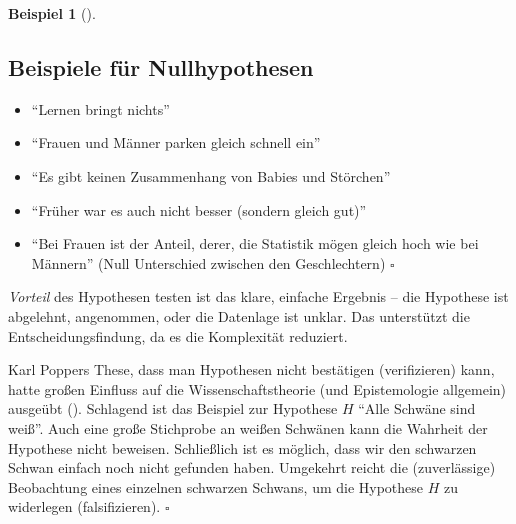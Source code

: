 \documentclass[
  ngerman,
  letterpaper,
  twoside,
  open=any]{scrbook}
\providecommand{\tightlist}{%
  \setlength{\itemsep}{0pt}\setlength{\parskip}{0pt}}\usepackage{longtable,booktabs,array}
\theoremstyle{definition}
\newtheorem{example}{Beispiel}[chapter]
\theoremstyle{plain}
\theoremstyle{definition}
\theoremstyle{definition}
\theoremstyle{remark}
\begin{document}
\begin{example}[]
\begin{tcolorbox}
\end{tcolorbox}


\subsection{Beispiele für
Nullhypothesen}\label{beispiele-fuxfcr-nullhypothesen-1}

\begin{itemize}
\tightlist
\item
  \enquote{Lernen bringt nichts}
\item
  \enquote{Frauen und Männer parken gleich schnell ein}
\item
  \enquote{Es gibt keinen Zusammenhang von Babies und Störchen}
\item
  \enquote{Früher war es auch nicht besser (sondern gleich gut)}
\item
  \enquote{Bei Frauen ist der Anteil, derer, die Statistik mögen gleich
  hoch wie bei Männern} (Null Unterschied zwischen den Geschlechtern)
  \(\square\)
\end{itemize}

\emph{Vorteil} des Hypothesen testen ist das klare, einfache Ergebnis --
die Hypothese ist abgelehnt, angenommen, oder die Datenlage ist unklar.
Das unterstützt die Entscheidungsfindung, da es die Komplexität
reduziert.

\begin{tcolorbox}[enhanced jigsaw, arc=.35mm, bottomrule=.15mm, bottomtitle=1mm, breakable, colback=white, colbacktitle=quarto-callout-note-color!10!white, colframe=quarto-callout-note-color-frame, coltitle=black, left=2mm, leftrule=.75mm, opacityback=0, opacitybacktitle=0.6, rightrule=.15mm, title=\textcolor{quarto-callout-note-color}{\faInfo}\hspace{0.5em}{Man kann Hypothesen nicht bestätigen}, titlerule=0mm, toprule=.15mm, toptitle=1mm]

Karl Poppers These, dass man Hypothesen nicht bestätigen (verifizieren)
kann, hatte großen Einfluss auf die Wissenschaftstheorie (und
Epistemologie allgemein) ausgeübt (). Schlagend ist das Beispiel zur Hypothese \(H\) \enquote{Alle
Schwäne sind weiß}. Auch eine große Stichprobe an weißen Schwänen kann
die Wahrheit der Hypothese nicht beweisen. Schließlich ist es möglich,
dass wir den schwarzen Schwan einfach noch nicht gefunden haben.
\footnotemark{} Umgekehrt reicht die (zuverlässige) Beobachtung eines
einzelnen schwarzen Schwans, um die Hypothese \(H\) zu widerlegen
(falsifizieren). \(\square\)


\end{tcolorbox}
\end{example}
\end{document}
